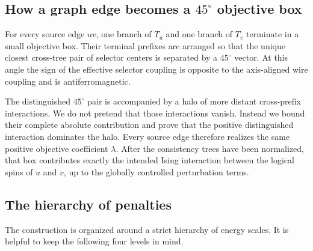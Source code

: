 \documentclass[12pt,a4paper]{article}
\begin{document}
\subsection*{How a graph edge becomes a $45^\circ$ objective box}

For every source edge $uv$, one branch of $T_u$ and one branch of $T_v$ terminate in a small objective box.  Their terminal prefixes are arranged so that the unique closest cross-tree pair of selector centers is separated by a $45^\circ$ vector.  At this angle the sign of the effective selector coupling is opposite to the axis-aligned wire coupling and is antiferromagnetic.

The distinguished $45^\circ$ pair is accompanied by a halo of more distant cross-prefix interactions.  We do not pretend that those interactions vanish.  Instead we bound their complete absolute contribution and prove that the positive distinguished interaction dominates the halo.  Every source edge therefore realizes the same positive objective coefficient $\lambda$.  After the consistency trees have been normalized, that box contributes exactly the intended Ising interaction between the logical spins of $u$ and $v$, up to the globally controlled perturbation terms.

\newpage
\subsection*{The hierarchy of penalties}

The construction is organized around a strict hierarchy of energy scales.  It is helpful to keep the following four levels in mind.
\end{document}
